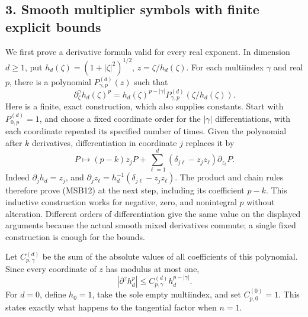 \documentclass[
  11pt,
]{article}
\begin{document}
\subsection{3. Smooth multiplier symbols with finite explicit
bounds}\label{smooth-multiplier-symbols-with-finite-explicit-bounds}

We first prove a derivative formula valid for every real exponent. In
dimension \(d\geq1\), put \(h_d(\zeta)=(1+|\zeta|^2)^{1/2}\),
\(z=\zeta/h_d(\zeta)\). For each multiindex \(\gamma\) and real \(p\),
there is a polynomial \(P_{\gamma,p}^{(d)}(z)\) such that \[
 \partial_\zeta^\gamma h_d(\zeta)^p
 =h_d(\zeta)^{p-|\gamma|}P_{\gamma,p}^{(d)}(\zeta/h_d(\zeta)).
 \tag{MSB12}
\] Here is a finite, exact construction, which also supplies constants.
Start with \(P_{0,p}^{(d)}=1\), and choose a fixed coordinate order for
the \(|\gamma|\) differentiations, with each coordinate repeated its
specified number of times. Given the polynomial after \(k\) derivatives,
differentiation in coordinate \(j\) replaces it by \[
 P\longmapsto(p-k)z_jP
       +\sum_{\ell=1}^d(\delta_{j\ell}-z_jz_\ell)\partial_{z_\ell}P.
 \tag{MSB13}
\] Indeed \(\partial_jh_d=z_j\), and
\(\partial_jz_\ell=h_d^{-1}(\delta_{j\ell}-z_jz_\ell)\). The product and
chain rules therefore prove (MSB12) at the next step, including its
coefficient \(p-k\). This inductive construction works for negative,
zero, and nonintegral \(p\) without alteration. Different orders of
differentiation give the same value on the displayed arguments because
the actual smooth mixed derivatives commute; a single fixed construction
is enough for the bounds.

Let \(C^{(d)}_{p,\gamma}\) be the sum of the absolute values of all
coefficients of this polynomial. Since every coordinate of \(z\) has
modulus at most one, \[
 |\partial^\gamma h_d^p|
 \leq C^{(d)}_{p,\gamma}h_d^{p-|\gamma|}.
 \tag{MSB14}
\] For \(d=0\), define \(h_0=1\), take the sole empty multiindex, and
set \(C^{(0)}_{p,0}=1\). This states exactly what happens to the
tangential factor when \(n=1\).
\end{document}
